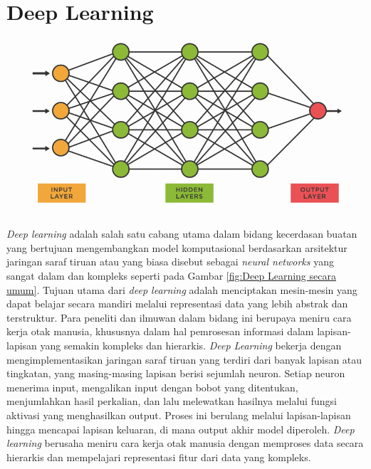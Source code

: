\section{Deep Learning}
\begin{center}
	\includegraphics[width=0.9\linewidth]{gambar/bener/ArsitekturDeeplearning.png}
	\label{fig:Deep Learning secara umum}
\end{center}  
\textit{Deep learning} adalah salah satu cabang utama dalam bidang kecerdasan buatan yang bertujuan mengembangkan model komputasional berdasarkan arsitektur jaringan saraf tiruan atau yang biasa disebut sebagai \textit{neural networks} yang sangat dalam dan kompleks seperti pada Gambar \ref{fig:Deep Learning secara umum}. Tujuan utama dari \textit{deep learning} adalah menciptakan mesin-mesin yang dapat belajar secara mandiri melalui representasi data yang lebih abstrak dan terstruktur. Para peneliti dan ilmuwan dalam bidang ini berupaya meniru cara kerja otak manusia, khususnya dalam hal pemrosesan informasi dalam lapisan-lapisan yang semakin kompleks dan hierarkis. \textit{Deep Learning} bekerja dengan mengimplementasikan jaringan saraf tiruan yang terdiri dari banyak lapisan atau tingkatan, yang masing-masing lapisan berisi sejumlah neuron. Setiap neuron menerima input, mengalikan input dengan bobot yang ditentukan, menjumlahkan hasil perkalian, dan lalu melewatkan hasilnya melalui fungsi aktivasi yang menghasilkan output. Proses ini berulang melalui lapisan-lapisan hingga mencapai lapisan keluaran, di mana output akhir model diperoleh. \textit{Deep learning} berusaha meniru cara kerja otak manusia dengan memproses data secara hierarkis dan mempelajari representasi fitur dari data yang kompleks. \cite{patterson2017deep}


